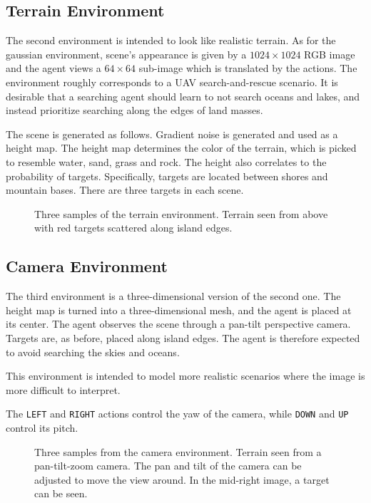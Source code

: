 \subsection{Terrain Environment}

The second environment is intended to look like realistic terrain.
As for the gaussian environment, scene's appearance is given by a \(1024 \times 1024\) RGB image and the agent views a \(64 \times 64\) sub-image which is translated by the actions.
The environment roughly corresponds to a UAV search-and-rescue scenario.
It is desirable that a searching agent should learn to not search oceans and lakes, and instead prioritize searching along the edges of land masses.

The scene is generated as follows.
Gradient noise is generated and used as a height map.
The height map determines the color of the terrain,
which is picked to resemble water, sand, grass and rock.
The height also correlates to the probability of targets.
Specifically, targets are located between shores and mountain bases.
There are three targets in each scene.

\begin{figure}
    \centering
    
    \label{fig:terrain}
    \caption[Terrain environment]{Three samples of the terrain environment. Terrain seen from above with red targets scattered along island edges.}
\end{figure}

\subsection{Camera Environment}

The third environment is a three-dimensional version of the second one.
The height map is turned into a three-dimensional mesh, and the agent is placed at its center.
The agent observes the scene through a pan-tilt perspective camera.
Targets are, as before, placed along island edges.
The agent is therefore expected to avoid searching the skies and oceans.

This environment is intended to model more realistic scenarios where the image is more difficult to interpret.

The \texttt{LEFT} and \texttt{RIGHT} actions control the yaw of the camera,
while \texttt{DOWN} and \texttt{UP} control its pitch.

\begin{figure}
    \centering
    
    \label{fig:camera}
    \caption[Camera environment]{Three samples from the camera environment. Terrain seen from a pan-tilt-zoom camera. The pan and tilt of the camera can be adjusted to move the view around. In the mid-right image, a target can be seen.}
\end{figure}

